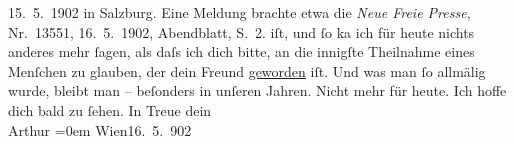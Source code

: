 \begin{ledgroupsized}[t]{13cm}
{{{                     15. 5. 1902 in Salzburg. Eine Meldung brachte etwa die \emph{Neue Freie Presse}, Nr. 13551,
                        16. 5. 1902, Abendblatt, S. 2.}}}\label{K_L01220_1h}
               iſt, und ſo ka{\geminationn} ich für heute nichts anderes mehr ſagen,
               als daſs ich dich bitte, an die innigſte {\pb}Theilnahme eines
               Menſchen zu glauben, der dein Freund \uline{geworden} iſt.
               Und was man ſo allmälig wurde, bleibt man – beſonders in unſeren Jahren. Nicht mehr
               für heute. Ich hoffe dich bald zu ſehen.\pend
           \pstart
           In Treue dein{\\[\baselineskip]}\spacefill\mbox{Arthur}\pend
           \leftskip=0em{}\pstart
           Wien16. 5. 902\pend
           \endnumbering{}\end{ledgroupsized}  \newcommand{\dateiname}{L01220}\newcommand{\titel}{Arthur Schnitzler an Hermann Bahr, 16. 5. 1902}\newcommand{\editorInnen}{ Kurt Ifkovits,  Martin Anton Müller}
      